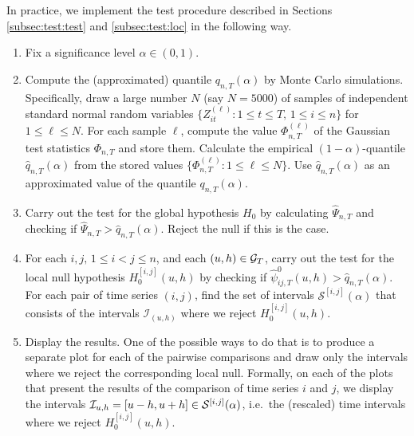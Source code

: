 \documentclass[a4paper,12pt]{article}
\begin{document}
In practice, we implement the test procedure described in Sections \ref{subsec:test:test} and \ref{subsec:test:loc} in the following way. 
\begin{enumerate}[label=\textit{Step \arabic*.}, leftmargin=1.45cm]
\item Fix a significance level $\alpha \in (0, 1)$. 
\item Compute the (approximated) quantile $q_{n, T}(\alpha)$ by Monte Carlo simulations. Specifically, draw a large number $N$ (say $N=5000$) of samples of independent standard normal random variables $\{Z_{it}^{(\ell)} : 1 \le t \le T, \, 1 \le i \le n \}$ for $1 \le \ell \le N$. For each sample $\ell$, compute the value $\Phi_{n,T}^{(\ell)}$ of the Gaussian test statistics $\Phi_{n, T}$ and store them. Calculate the empirical $(1-\alpha)$-quantile $\hat{q}_{n, T}(\alpha)$ from the stored values $\{ \Phi_{n, T}^{(\ell)}: 1 \le \ell \le N \}$. Use $\hat{q}_{n, T}(\alpha)$ as an approximated value of the quantile $q_{n, T}(\alpha)$.
\item Carry out the test for the global hypothesis $H_0$ by calculating $\widehat{\Psi}_{n, T}$ and checking if $\widehat{\Psi}_{n, T} > \hat{q}_{n, T}(\alpha)$. Reject the null if this is the case.
\item For each $i, j,\, 1 \le i < j \le n$, and each $(u, h) \in \mathcal{G}_T$, carry out the test for the local null hypothesis $H_0^{[i, j]}(u, h)$ by checking if $\hat{\psi}^0_{ij, T}(u, h)> \hat{q}_{n, T}(\alpha)$. For each pair of time series $(i, j)$, find the set of intervals $\mathcal{S}^{[i, j]}(\alpha)$ that consists of the intervals $\mathcal{I}_{(u, h)}$ where we reject $H_0^{[i, j]}(u, h)$. 
\item Display the results. One of the possible ways to do that is to produce a separate plot for each of the pairwise comparisons and draw only the intervals where we reject the corresponding local null. Formally, on each of the plots that present the results of the comparison of time series $i$ and $j$, we display the intervals $\mathcal{I}_{u, h} = [u- h, u+h] \in \mathcal{S}^{[i, j]}(\alpha)$, i.e.\ the (rescaled) time intervals where we reject $H_0^{[i, j]}(u, h)$.
\end{enumerate}
\end{document}
